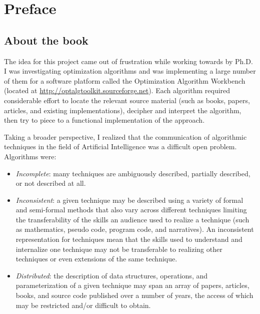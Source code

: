 

\chapter*{Preface}

% 
% 
\section*{About the book}
The idea for this project came out of frustration while working towards by Ph.D. I was investigating optimization algorithms and was implementing a large number of them for a software platform called the Optimization Algorithm Workbench (located at \url{http://optalgtoolkit.sourceforge.net}). Each algorithm required considerable effort to locate the relevant source material (such as books, papers, articles, and existing implementations), decipher and interpret the algorithm, then try to piece to a functional implementation of the approach. 

Taking a broader perspective, I realized that the communication of algorithmic techniques in the field of Artificial Intelligence was a difficult open problem. Algorithms were:

\begin{itemize}
	\item \emph{Incomplete}: many techniques are ambiguously described, partially described, or not described at all.
	\item \emph{Inconsistent}: a given technique may be described using a variety of formal and semi-formal methods that also vary across different techniques limiting the transferability of the skills an audience used to realize a technique (such as mathematics, pseudo code, program code, and narratives). An inconsistent representation for techniques mean that the skills used to understand and internalize one technique may not be transferable to realizing other techniques or even extensions of the same technique.
	\item \emph{Distributed}: the description of data structures, operations, and parameterization of a given technique may span an array of papers, articles, books, and source code published over a number of years, the access of which may be restricted and/or difficult to obtain.
\end{itemize}

